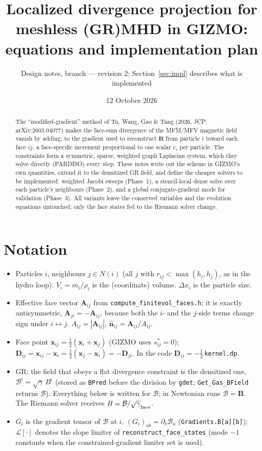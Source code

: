 \documentclass[11pt,a4paper]{article}
\title{Localized divergence projection for meshless (GR)MHD in GIZMO:\\ equations and implementation plan}
\author{Design notes, \code{divfree/} branch --- revision 2: Section~\ref{sec:impl} describes what is implemented}
\date{12 October 2026}
\newcommand{\cB}{\mathcal{B}}
\newcommand{\bA}{\bm{A}}
\newcommand{\bD}{\bm{D}}
\newcommand{\bx}{\bm{x}}
\newcommand{\pd}{\partial}
\newcommand{\sg}{\sqrt{\gamma}}
\newcommand{\code}[1]{\texttt{#1}}
\begin{document}
\maketitle

\begin{abstract}
The ``modified-gradient'' method of Tu, Wang, Gao \& Tang (2026, JCP; arXiv:2603.04077) makes the face-sum divergence of the MFM/MFV magnetic field vanish by adding, to the gradient used to reconstruct $\bm B$ from particle $i$ toward each face $ij$, a face-specific increment proportional to one scalar $c_i$ per particle. The constraints form a symmetric, sparse, weighted graph Laplacian system, which they solve directly (PARDISO) every step. These notes write out the scheme in GIZMO's own quantities, extend it to the densitized GR field, and define the cheaper solvers to be implemented: weighted Jacobi sweeps (Phase~1), a stencil-local dense solve over each particle's neighbours (Phase~2), and a global conjugate-gradient mode for validation (Phase~3). All variants leave the conserved variables and the evolution equations untouched; only the face states fed to the Riemann solver change.
\end{abstract}

\section{Notation}
\begin{itemize}
\item Particles $i$, neighbours $j\in N(i)$ (all $j$ with $r_{ij}<\max(h_i,h_j)$, as in the hydro loop). $V_i=m_i/\rho_i$ is the (coordinate) volume. $\Delta x_i$ is the particle size.
\item Effective face vector $\bA_{ij}$ from \code{compute\_finitevol\_faces.h}; it is exactly antisymmetric, $\bA_{ji}=-\bA_{ij}$, because both the $i$- and the $j$-side terms change sign under $i\leftrightarrow j$. $A_{ij}=|\bA_{ij}|$, $\hat{\bm n}_{ij}=\bA_{ij}/A_{ij}$.
\item Face point $\bx_{ij}=\tfrac12(\bx_i+\bx_j)$ (GIZMO uses $s^*_{ij}=0$); $\bD_{ij}=\bx_{ij}-\bx_i=\tfrac12(\bx_j-\bx_i)=-\bD_{ji}$. In the code $\bD_{ij}=-\tfrac12\,$\code{kernel.dp}.
\item GR: the field that obeys a flat divergence constraint is the densitized one, $\cB^i=\sg\,B^i$ (stored as \code{BPred} before the division by \code{gdet}; \code{Get\_Gas\_BField} returns $\cB$). Everything below is written for $\cB$; in Newtonian runs $\cB=\bm B$. The Riemann solver receives $B=\cB/\sg_{\rm face}$.
\item $G_i$ is the gradient tensor of $\cB$ at $i$, $(G_i)_{ab}=\pd_b\cB_a$ (\code{Gradients.B[a][b]}); $\mathcal{L}[\cdot]$ denotes the slope limiter of \code{reconstruct\_face\_states} (mode $-1$ constants when the constrained-gradient limiter set is used).
\end{itemize}
\end{document}
